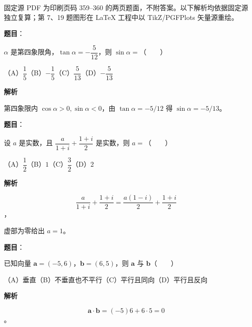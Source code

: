 

\begin{gktip}
固定源 PDF 为印刷页码 359–360 的两页题面，不附答案。以下解析均依据固定源独立复算；第 7、19 题图形在 LaTeX 工程中以 TikZ/PGFPlots 矢量源重绘。
\end{gktip}

\begin{answer}

\textbf{题目}：

$\alpha$ 是第四象限角，$\tan\alpha=-\dfrac5{12}$，则 $\sin\alpha=$\mbox{（　　）}

（A）$\dfrac15$\quad（B）$-\dfrac15$\quad（C）$\dfrac5{13}$\quad（D）$-\dfrac5{13}$

\textbf{解析}

第四象限内 $\cos\alpha>0,\sin\alpha<0$，由 $\tan\alpha=-5/12$ 得 $\sin\alpha=-5/13$。


\end{answer}
\begin{answer}

\textbf{题目}：

设 $a$ 是实数，且 $\dfrac{a}{1+i}+\dfrac{1+i}{2}$ 是实数，则 $a=$\mbox{（　　）}

（A）$\dfrac12$\quad（B）$1$\quad（C）$\dfrac32$\quad（D）$2$

\textbf{解析}

\nopagebreak[4]
\[
\frac{a}{1+i}+\frac{1+i}{2}
=\frac{a(1-i)}2+\frac{1+i}{2}
\]
，

虚部为零给出 $a=1$。


\end{answer}
\begin{answer}

\textbf{题目}：

已知向量 $\boldsymbol a=(-5,6)$，$\boldsymbol b=(6,5)$，则 $\boldsymbol a$ 与 $\boldsymbol b$\mbox{（　　）}

（A）垂直\quad（B）不垂直也不平行\quad（C）平行且同向\quad（D）平行且反向

\textbf{解析}

\nopagebreak[4]
\[
\boldsymbol a\cdot\boldsymbol b=(-5)6+6\cdot5=0
\]
。


\end{answer}
